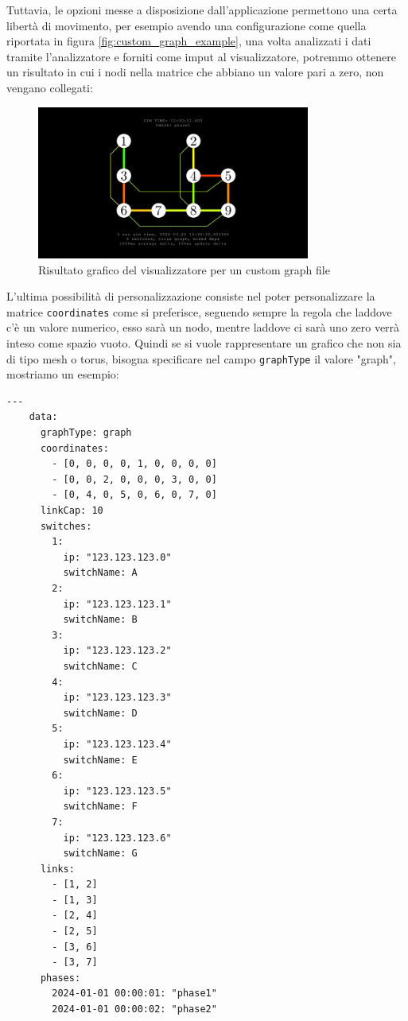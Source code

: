 \documentclass[binding=0.6cm]{sapthesis}
\begin{document}
Tuttavia, le opzioni messe a disposizione dall'applicazione permettono una certa libertà di movimento,
per esempio avendo una configurazione come quella riportata in figura \ref{fig:custom_graph_example},
una volta analizzati i dati tramite l'analizzatore e forniti come imput al visualizzatore, potremmo ottenere
un risultato in cui i nodi nella matrice che abbiano un valore pari a zero, non vengano
collegati:
\begin{figure}[h]
    \centering
    \includegraphics[width=0.8\textwidth]{immagini/only_links.JPG}
    \caption{Risultato grafico del visualizzatore per un custom graph file}
    \label{fig:hybrid_custom_torus}
\end{figure}

L'ultima possibilità di personalizzazione consiste nel poter personalizzare la matrice \texttt{coordinates} come si preferisce, seguendo sempre la regola
che laddove c'è un valore numerico, esso sarà un nodo, mentre laddove ci sarà uno zero verrà inteso come spazio vuoto. Quindi se si vuole rappresentare
un grafico che non sia di tipo mesh o torus, bisogna specificare nel campo \texttt{graphType} il valore "graph", mostriamo un esempio:

{\scriptsize %
\begin{lstlisting}[caption={Esempio di custom graph file, \texttt{graphType} posto al valore graph}]
    ---
    data:
      graphType: graph
      coordinates:
        - [0, 0, 0, 0, 1, 0, 0, 0, 0]
        - [0, 0, 2, 0, 0, 0, 3, 0, 0]
        - [0, 4, 0, 5, 0, 6, 0, 7, 0]
      linkCap: 10
      switches:
        1:
          ip: "123.123.123.0"
          switchName: A
        2:
          ip: "123.123.123.1"
          switchName: B
        3:
          ip: "123.123.123.2"
          switchName: C
        4:
          ip: "123.123.123.3"
          switchName: D
        5:
          ip: "123.123.123.4"
          switchName: E
        6:
          ip: "123.123.123.5"
          switchName: F
        7:
          ip: "123.123.123.6"
          switchName: G
      links:
        - [1, 2]
        - [1, 3]
        - [2, 4]
        - [2, 5]
        - [3, 6]
        - [3, 7]
      phases:
        2024-01-01 00:00:01: "phase1"
        2024-01-01 00:00:02: "phase2"
\end{lstlisting}
}
\end{document}
